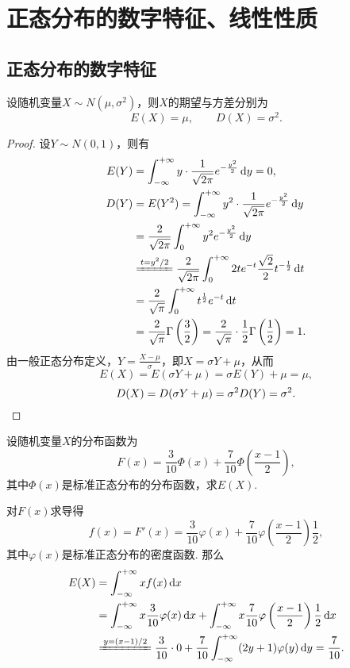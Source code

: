 \section{正态分布的数字特征、线性性质}
\subsection{正态分布的数字特征}
\begin{theorem}\label{theorem:正态分布与自然指数分布族.正态分布的数字特征}
设随机变量\(X \sim N(\mu,\sigma^2)\)，则\(X\)的期望与方差分别为\[
E(X) = \mu,
\qquad
D(X) = \sigma^2.
\]
\begin{proof}
设\(Y \sim N(0,1)\)，则有\begin{align*}
E(Y) &= \int_{-\infty}^{+\infty} y \cdot \frac{1}{\sqrt{2\pi}} e^{-\frac{y^2}{2}} \dd{y} = 0, \\
D(Y) &= E(Y^2)
 = \int_{-\infty}^{+\infty} y^2 \cdot \frac{1}{\sqrt{2\pi}} e^{-\frac{y^2}{2}} \dd{y} \\
 &= \frac{2}{\sqrt{2\pi}} \int_0^{+\infty} y^2 e^{-\frac{y^2}{2}} \dd{y} \\
 &\xlongequal{t=y^2/2} \frac{2}{\sqrt{2\pi}} \int_0^{+\infty} 2 t e^{-t} \frac{\sqrt{2}}{2} t^{-\frac{1}{2}} \dd{t} \\
 &=\frac{2}{\sqrt{\pi}} \int_0^{+\infty} t^{\frac{1}{2}} e^{-t} \dd{t} \\
 &= \frac{2}{\sqrt{\pi}} \Gamma\left(\frac{3}{2}\right)
 = \frac{2}{\sqrt{\pi}} \cdot \frac{1}{2} \Gamma\left(\frac{1}{2}\right)
 = 1.
\end{align*}
由一般正态分布定义，\(Y = \frac{X-\mu}{\sigma}\)，即\(X = \sigma Y + \mu\)，从而\[
E(X) = E(\sigma Y + \mu) = \sigma E(Y) + \mu = \mu,
\]\[
D(X) = D(\sigma Y + \mu) = \sigma^2 D(Y) = \sigma^2.
\qedhere
\]
\end{proof}
\end{theorem}

\begin{example}
设随机变量\(X\)的分布函数为\[
F(x) = \frac{3}{10} \Phi(x) + \frac{7}{10} \Phi\left(\frac{x-1}{2}\right),
\]其中\(\Phi(x)\)是标准正态分布的分布函数，求\(E(X)\).
\begin{solution}
对\(F(x)\)求导得\[
f(x) = F'(x) = \frac{3}{10} \varphi(x) + \frac{7}{10} \varphi\left(\frac{x-1}{2}\right) \frac{1}{2},
\]其中\(\varphi(x)\)是标准正态分布的密度函数.
那么\begin{align*}
E(X) &= \int_{-\infty}^{+\infty} x f(x) \dd{x} \\
&= \int_{-\infty}^{+\infty} x \frac{3}{10} \varphi(x) \dd{x}
+ \int_{-\infty}^{+\infty} x \frac{7}{10} \varphi\left(\frac{x-1}{2}\right) \frac{1}{2} \dd{x} \\
&\xlongequal{y=(x-1)/2} \frac{3}{10} \cdot 0
+ \frac{7}{10} \int_{-\infty}^{+\infty} (2y+1) \varphi(y) \dd{y}
= \frac{7}{10}.
\end{align*}
\end{solution}
\end{example}

